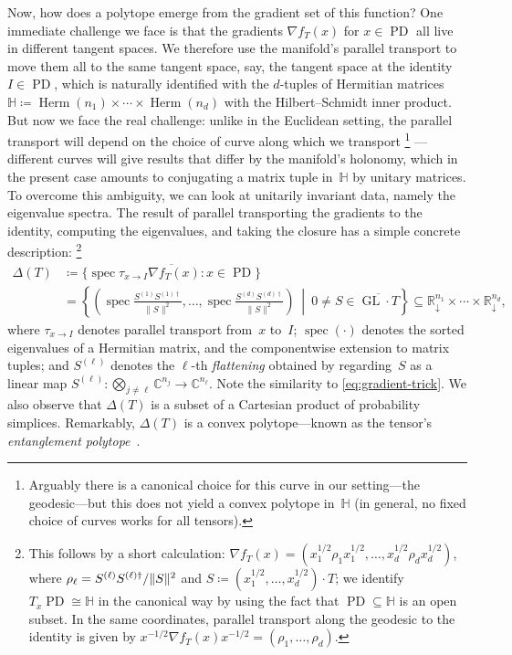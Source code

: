 \documentclass[11pt,letterpaper]{article}
\numberwithin{equation}{section}
\newcommand{\RR}{\mathbb{R}}
\newcommand{\CC}{\mathbb{C}}
\newcommand{\bbH}{\mathbb{H}}
\DeclareMathOperator{\PD}{PD}
\DeclareMathOperator{\spec}{spec}
\DeclareMathOperator{\GL}{GL}
\DeclareMathOperator{\Herm}{Herm}
\DeclarePairedDelimiter\norm{\lVert}{\rVert}
\begin{document}
Now, how does a polytope emerge from the gradient set of this function?
One immediate challenge we face is that the gradients $\nabla f_T(x)$ for $x \in \PD$ all live in different tangent spaces.
We therefore use the manifold's parallel transport to move them all to the same tangent space, say, the tangent space at the identity~$I \in \PD$, which is naturally identified with the $d$-tuples of Hermitian matrices $\bbH \coloneqq \Herm(n_1)\times\cdots\times\Herm(n_d)$ with the Hilbert--Schmidt inner product.
But now we face the real challenge: unlike in the Euclidean setting, the parallel transport will depend on the choice of curve along which we transport%
\footnote{Arguably there is a canonical choice for this curve in our setting---the geodesic---but this does not yield a convex polytope in~$\bbH$ (in general, no fixed choice of curves works for all tensors).}%
---different curves will give results that differ by the manifold's holonomy, which in the present case amounts to conjugating a matrix tuple in~$\bbH$ by unitary matrices.
To overcome this ambiguity, we can look at unitarily invariant data, namely the eigenvalue spectra.
The result of parallel transporting the gradients to the identity, computing the eigenvalues, and taking the closure has a simple concrete description:%
\footnote{This follows by a short calculation: $\nabla f_T(x) = (x_1^{1/2} \rho_1 x_1^{1/2}, \dots, x_d^{1/2} \rho_d x_d^{1/2})$, where $\rho_\ell = S^{(\ell)} S^{(\ell)\dagger} / \norm S^2$ and $S \coloneqq (x_1^{1/2}, \dots, x_d^{1/2}) \cdot T$; we identify $T_x \PD \cong \bbH$ in the canonical way by using the fact that $\PD \subseteq \bbH$ is an open subset.
In the same coordinates, parallel transport along the geodesic to the identity is given by $x^{-1/2} \nabla f_T(x) x^{-1/2} = (\rho_1,\dots,\rho_d)$.}
\begin{equation}\label{eq:intro-entanglement-polytope}
\begin{aligned}
    \Delta(T)
&\coloneqq \overline{ \{ \spec \tau_{x\to I} \nabla f_T(x) : x \in \PD \} } \\
&= \left\{\left(\spec{\frac{S^{(1)}S^{(1)\dag}}{\|S\|^2}},\ldots, \spec{\frac{S^{(d)}S^{(d)\dag}}{\|S\|^2}} \right) \ \middle|\ 0\neq S \in \overline{\GL\cdot T} \right\} \subseteq \RR_{\downarrow}^{n_1} \!\times\! \cdots \!\times\! \RR_{\downarrow}^{n_d},
\end{aligned}
\end{equation}
where $\tau_{x\to I}$ denotes parallel transport from~$x$ to~$I$;
$\spec(\cdot)$ denotes the sorted eigenvalues of a Hermitian matrix, and the componentwise extension to matrix tuples;
and $S^{(\ell)}$ denotes the $\ell$-th \emph{flattening} obtained by regarding~$S$ as a linear map $S^{(\ell)} \colon \bigotimes_{j\neq \ell} \CC^{n_j}\rightarrow \CC^{n_\ell}$.
Note the similarity to \cref{eq:gradient-trick}.
We also observe that $\Delta(T)$ is a subset of a Cartesian product of probability simplices.
Remarkably, $\Delta(T)$ is a convex polytope---known as the tensor's \emph{entanglement polytope}~\cite{WDGC2013_entanglement}.
\end{document}
